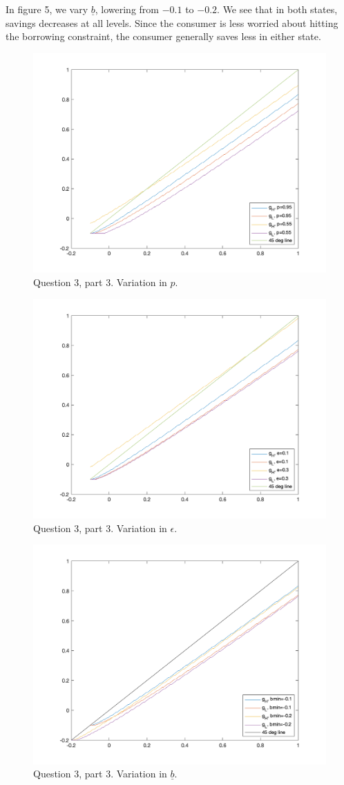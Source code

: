 \documentclass[10pt,letter]{article}
\begin{document}
In figure 5, we vary $\underline{b}$, lowering from $-0.1$ to $-0.2$. We see that in both states, savings decreases at all levels. Since the consumer is less worried about hitting the borrowing constraint, the consumer generally saves less in either state.
\begin{figure}
\centering
\includegraphics[scale=0.8]{ps5q3p3_1}
\caption{Question 3, part 3. Variation in $p$.}
\end{figure}
\begin{figure}
\centering
\includegraphics[scale=0.8]{ps5q3p3_2}
\caption{Question 3, part 3. Variation in $\epsilon$.}
\end{figure}
\begin{figure}
\centering
\includegraphics[scale=0.8]{ps5q3p3_3}
\caption{Question 3, part 3. Variation in $\underline{b}$.}
\end{figure}
\end{document}
